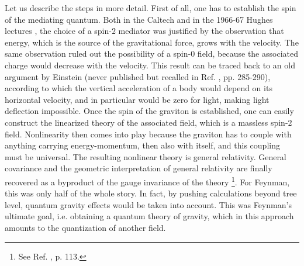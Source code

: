 \documentclass{ws-procs961x669}            %
\begin{document}
%
Let us describe the steps in more detail. First of all, one has to
establish the spin of the mediating quantum. Both in the Caltech
\cite{Feynman:1996kb} and in the 1966-67 Hughes lectures
\cite{FeynmanHughes1}, the choice of a spin-$2$ mediator was
justified by the observation that energy, which is the source of
the gravitational force, grows with the velocity. The same
observation ruled out the possibility of a spin-$0$ field, because
the associated charge would decrease with the velocity. This
result can be traced back to an old argument by Einstein (never
published but recalled in Ref. , pp.
285-290), according to which the vertical acceleration of a body
would depend on its horizontal velocity, and in particular would
be zero for light, making light deflection impossible. Once the
spin of the graviton is established, one can easily construct the
linearized theory of the associated field, which is a massless
spin-$2$ field. Nonlinearity then comes into play because the
graviton has to couple with anything carrying energy-momentum,
then also with itself, and this coupling must be universal. The
resulting nonlinear theory is general relativity. General
covariance and the geometric interpretation of general relativity
are finally recovered as a byproduct of the gauge invariance of
the theory \footnote{See Ref. , p. 113.}.
For Feynman, this was only half of the whole story. In fact, by
pushing calculations beyond tree level, quantum gravity effects
would be taken into account. This was Feynman's ultimate goal,
i.e. obtaining a quantum theory of gravity, which in this approach
amounts to the quantization of another field.
\end{document}
